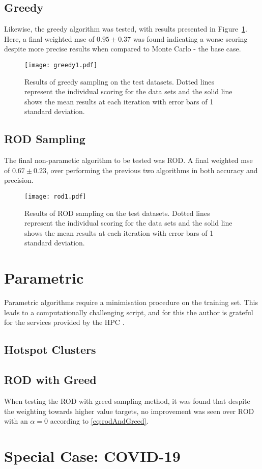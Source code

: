\subsection{Greedy}
Likewise, the greedy algorithm was tested, with results presented in Figure~\ref{fig:GreedyTestSet}. Here, a final weighted mse of $0.95\pm{}0.37$ was found indicating a worse scoring despite more precise results when compared to Monte Carlo - the base case.
\begin{figure}[h]
    \begin{center}
        \texttt{[image: greedy1.pdf]}
        \caption[Greedy]{Results of greedy sampling on the test datasets. Dotted lines represent the individual scoring for the data sets and the solid line shows the mean results at each iteration with error bars of 1 standard deviation.}
        \label{fig:GreedyTestSet}
    \end{center}
\end{figure}

\subsection{ROD Sampling}
The final non-parametic algorithm to be tested was ROD. A final weighted mse of $0.67\pm{}0.23$, over performing the previous two algorithms in both accuracy and precision.

\begin{figure}[h]
    \begin{center}
        \texttt{[image: rod1.pdf]}
        \caption[ROD]{Results of ROD sampling on the test datasets. Dotted lines represent the individual scoring for the data sets and the solid line shows the mean results at each iteration with error bars of 1 standard deviation.}
        \label{fig:RODTestSet}
    \end{center}
\end{figure}

\section{Parametric}
Parametric algorithms require a minimisation procedure on the training set. This leads to a computationally challenging script, and for this the author is grateful for the services provided by the HPC \cite{HPC}.
\subsection{Hotspot Clusters}
\blindtext[1]
\subsection{ROD with Greed}
When testing the ROD with greed sampling method, it was found that despite the weighting towards higher value targets, no improvement was seen over ROD with an $\alpha{}=0$ according to \ref{eq:rodAndGreed}.

\section{Special Case: COVID-19}
